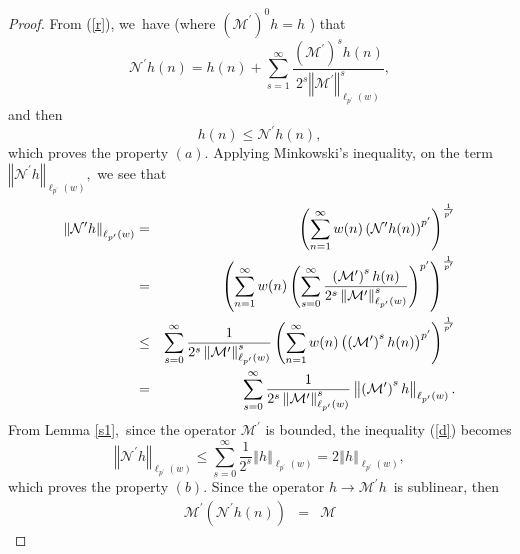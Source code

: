 \documentclass[a4paper]{amsart}
\theoremstyle{plain}
\numberwithin{equation}{section}
\begin{document}
\begin{proof}
From (\ref{r}), we\ have (where $\left( \mathcal{M}^{\prime }\right) ^{0}h=h$%
) that%
\begin{equation*}
\mathcal{N}^{\prime }h(n)=h(n)+\sum_{s=1}^{\infty }\frac{\left( \mathcal{M}%
^{\prime }\right) ^{s}h(n)}{2^{s}\left\Vert \mathcal{M}^{\prime }\right\Vert
_{\ell _{p^{\prime }}(w)}^{s}},
\end{equation*}%
and then%
\begin{equation*}
h(n)\leq \mathcal{N}^{\prime }h(n),
\end{equation*}%
which proves the property $(a).$ Applying Minkowski's inequality, on the
term $\left\Vert \mathcal{N}^{\prime }h\right\Vert _{\ell _{p^{\prime
}}(w)}, $ we see that%
\begin{eqnarray}
\left\Vert \mathcal{N}^{\prime }h\right\Vert _{\ell _{p^{\prime }}(w)}
&=&\left( \sum_{n=1}^{\infty }w(n)\left( \mathcal{N}^{\prime }h(n)\right)
^{p^{\prime }}\right) ^{\frac{1}{p^{\prime }}}  \notag \\
&=&\left( \sum_{n=1}^{\infty }w(n)\left( \sum_{s=0}^{\infty }\frac{\left( 
\mathcal{M}^{\prime }\right) ^{s}h(n)}{2^{s}\left\Vert \mathcal{M}^{\prime
}\right\Vert _{\ell _{p^{\prime }}(w)}^{s}}\right) ^{p^{\prime }}\right) ^{%
\frac{1}{p^{\prime }}}  \notag \\
&\leq &\sum_{s=0}^{\infty }\frac{1}{2^{s}\left\Vert \mathcal{M}^{\prime
}\right\Vert _{\ell _{p^{\prime }}(w)}^{s}}\left( \sum_{n=1}^{\infty
}w(n)\left( \left( \mathcal{M}^{\prime }\right) ^{s}h(n)\right) ^{p^{\prime
}}\right) ^{\frac{1}{p^{\prime }}}  \notag \\
&=&\sum_{s=0}^{\infty }\frac{1}{2^{s}\left\Vert \mathcal{M}^{\prime
}\right\Vert _{\ell _{p^{\prime }}(w)}^{s}}\left\Vert \left( \mathcal{M}%
^{\prime }\right) ^{s}h\right\Vert _{\ell _{p^{\prime }}(w)}.  \label{d}
\end{eqnarray}%
From Lemma \ref{s1},\ since the operator $\mathcal{M}^{\prime }$ is bounded,
the inequality (\ref{d}) becomes 
\begin{equation*}
\left\Vert \mathcal{N}^{\prime }h\right\Vert _{\ell _{p^{\prime }}(w)}\leq
\sum_{s=0}^{\infty }\frac{1}{2^{s}}\left\Vert h\right\Vert _{\ell
_{p^{\prime }}(w)}=2\left\Vert h\right\Vert _{\ell _{p^{\prime }}(w)},
\end{equation*}%
which proves the property $(b).$ Since the operator $h\rightarrow \mathcal{M}%
^{\prime }h$\ is sublinear, then\ 
\begin{eqnarray*}
\mathcal{M}^{\prime }\left( \mathcal{N}^{\prime }h(n)\right) &=&\mathcal{M}%

\end{eqnarray*}
\end{proof}
\end{document}

